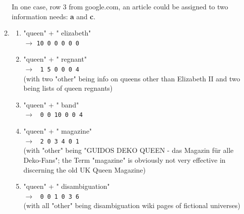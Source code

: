 \documentclass[10pt,a4paper]{article}
\begin{document}
\begin{enumerate}
        In one case, row 3 from google.com, an article could be assigned to two information needs: \textbf{a} and \textbf{c}.
    \item \begin{enumerate}
            \item "queen" + " elizabeth"\\
                $\rightarrow$ \texttt{10  0  0  0  0  0}
            \item "queen" + " regnant"\\
                $\rightarrow$ \texttt{ 1  5  0  0  0  4}
                \\(with two "other" being info on queens other than Elizabeth II and two being lists of queen regnants)
            \item "queen" + " band"\\
                $\rightarrow$ \texttt{ 0  0 10  0  0  4}
            \item "queen" + " magazine"\\
                $\rightarrow$ \texttt{ 2  0  3  4  0  1}\\
                (with "other" being "GUIDOS DEKO QUEEN - das Magazin für alle Deko-Fans"; the Term "magazine" is obviously not very effective in discerning the old UK Queen Magazine)
            \item "queen" + " disambiguation"\\
                $\rightarrow$ \texttt{ 0  0  1  0  3  6}\\
                (with all "other" being disambiguation wiki pages of fictional universes)
        \end{enumerate}
\end{enumerate}
\end{document}
